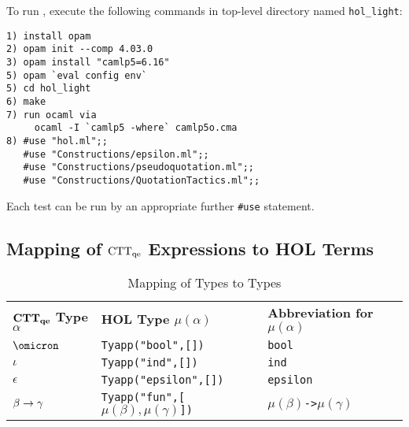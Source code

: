 \documentclass[fleqn]{llncs}
\begin{document}
To run {\HLQE}, execute the following commands in {\HLQE} top-level
directory named \texttt{hol\_light}:

\begin{lstlisting}
1) install opam
2) opam init --comp 4.03.0                                                      
3) opam install "camlp5=6.16" 
5) opam `eval config env`
5) cd hol_light
6) make
7) run ocaml via                                                                
     ocaml -I `camlp5 -where` camlp5o.cma                                        
8) #use "hol.ml";;
   #use "Constructions/epsilon.ml";;
   #use "Constructions/pseudoquotation.ml";;
   #use "Constructions/QuotationTactics.ml";;
\end{lstlisting}
\noindent Each test can be run by an appropriate further
\lstinline|#use| statement.

\subsection{Mapping of ${\rm CTT_{qe}}$ Expressions to HOL Terms}\label{subsec:mapping}

\begin{table}[b]
\bc
\begin{tabular}{|lll|}
\hline
\textbf{${\bf CTT_{qe}}$ Type $\alpha$} \hspace*{2ex}
  & \textbf{HOL Type $\mu(\alpha)$}
  & \textbf{Abbreviation for $\mu(\alpha)$}\\
$\omicron$ & \texttt{Tyapp("bool",[])} & \texttt{bool}\\
$\iota$ & \texttt{Tyapp("ind",[])} & \texttt{ind}\\
$\epsilon$ & \texttt{Tyapp("epsilon",[])} & \texttt{epsilon}\\
$\beta \rightarrow \gamma$ 
  & \texttt{Tyapp("fun",[\mbox{$\mu(\beta),\mu(\gamma)$}])} \hspace*{2ex}
  & \texttt{\mbox{$\mu(\beta)$}->\mbox{$\mu(\gamma)$}}\\  
\hline
\end{tabular}
\ec
\caption{Mapping of {\churchqe} Types to {\HOL} Types}\label{tab:types} 
\end{table}
\end{document}
